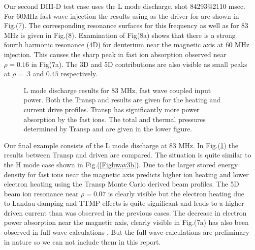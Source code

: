   Our second DIII-D test case uses the L mode discharge, shot
  84293@2110 msec.  For 60MHz fast
  wave injection  the results using \ot as the driver for \ct are shown
  in Fig.(7). %
  The corresponding resonance surfaces for this frequency as well as
  for 83 MHz is given in Fig.(8). Examination of Fig(8a) shows that
  there is a strong fourth harmonic resonance (4D) for deuterium  near the magnetic
  axis at 60 MHz injection. This causes the sharp peak in fast ion
  absorption observed near $\rho = 0.16 $ in Fig(7a). The 3D and 5D
  contributions are also visible as small peaks at $\rho = .3$ and $
  0.45 $ respectively.

 \begin{figure}[hbt]
 \centering   
\begin{narrow}{-0.40in}{0in}
 \mbox{}
\end{narrow}
 \mbox{}
 \caption{L mode discharge results for 83 MHz, fast wave coupled
   input power. Both the Transp and \ot results are given for the
   heating and current drive profiles. Transp has significantly more
   power absorption by the fast ions. The total and thermal pressures
  determined by Transp and \ot are given in the lower figure. } 
  \label{Figbwav3d}
 \end{figure}


   Our final example consists of the L mode discharge at 83
   MHz. In Fig.(\ref{Figbwav3d}) the results between Transp and \ot
   driven \ct are compared. The situation is quite similar to the
   H mode case shown in Fig.(\ref{Figbwav3b}). Due to the larger
   stored energy density for fast ions near the magnetic axis \ct 
   predicts higher ion heating and lower electron heating using the
   Transp Monte Carlo derived beam profiles. The 5D beam ion
   resonance near $\rho = 0.07 $ is clearly visible but the 
   electron heating due to Landau damping and TTMP effects is quite
   significant and leads to a higher driven current than was observed
   in the previous cases. The decrease in electron power absorption
   near the magnetic axis, clearly visible in Fig.(7a) has also been
   observed in full wave calculations \cite{b1}. But the  full wave
   calculations are preliminary in nature so we  can not include them 
   in this report. 

